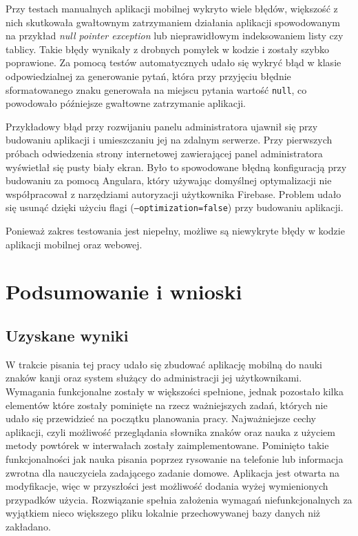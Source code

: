 \documentclass[a4paper,twoside,12pt]{book}
\newcommand{\obcy}[1]{\emph{#1}}
\newcommand{\english}[1]{{\selectlanguage{british}\obcy{#1}}}
\begin{document}
Przy testach manualnych aplikacji mobilnej wykryto wiele błędów, większość z nich skutkowała gwałtownym zatrzymaniem działania aplikacji spowodowanym na przykład \english{null pointer exception} lub nieprawidłowym indeksowaniem listy czy tablicy. Takie błędy wynikały z drobnych pomyłek w kodzie i zostały szybko poprawione. Za pomocą testów automatycznych udało się wykryć błąd w klasie odpowiedzialnej za generowanie pytań, która przy przyjęciu błędnie sformatowanego znaku generowała na miejscu pytania wartość \texttt{null}, co powodowało późniejsze gwałtowne zatrzymanie aplikacji.

Przykładowy błąd przy rozwijaniu panelu administratora ujawnił się przy budowaniu aplikacji i umieszczaniu jej na zdalnym serwerze. Przy pierwszych próbach odwiedzenia strony internetowej zawierającej panel administratora wyświetlał się pusty biały ekran. Było to spowodowane błędną konfiguracją przy budowaniu za pomocą Angulara, który używając domyślnej optymalizacji nie współpracował z narzędziami autoryzacji użytkownika Firebase. Problem udało się usunąć dzięki użyciu flagi (\texttt{--optimization=false}) przy budowaniu aplikacji.

Ponieważ zakres testowania jest niepełny, możliwe są niewykryte błędy w kodzie aplikacji mobilnej oraz webowej.

\chapter{Podsumowanie i wnioski}


\section{Uzyskane wyniki}

W trakcie pisania tej pracy udało się zbudować aplikację mobilną do nauki znaków kanji oraz system służący do administracji jej użytkownikami. Wymagania funkcjonalne zostały w większości spełnione, jednak pozostało kilka elementów które zostały pominięte na rzecz ważniejszych zadań, których nie udało się przewidzieć na początku planowania pracy. Najważniejsze cechy aplikacji, czyli możliwość przeglądania słownika znaków oraz nauka z użyciem metody powtórek w interwałach zostały zaimplementowane. Pominięto takie funkcjonalności jak nauka pisania poprzez rysowanie na telefonie lub informacja zwrotna dla nauczyciela zadającego zadanie domowe. Aplikacja jest otwarta na modyfikacje, więc w przyszłości jest możliwość dodania wyżej wymienionych przypadków użycia. Rozwiązanie spełnia założenia wymagań niefunkcjonalnych za wyjątkiem nieco większego pliku lokalnie przechowywanej bazy danych niż zakładano.
\end{document}
